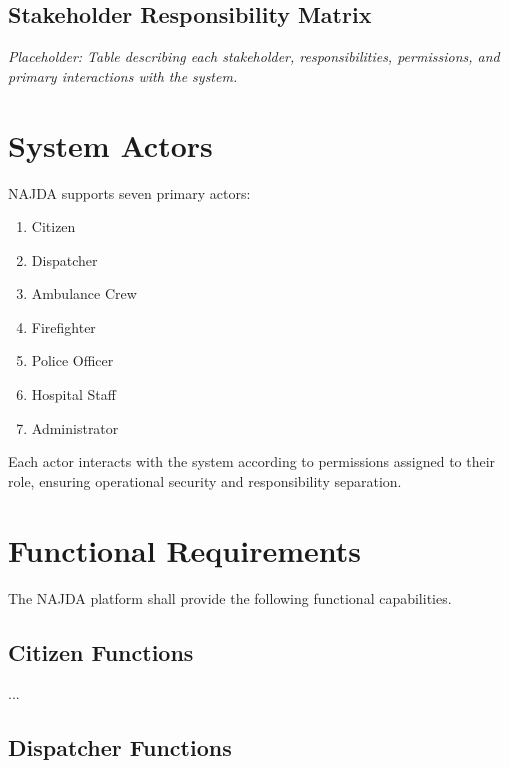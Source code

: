 \subsection{Stakeholder Responsibility Matrix}

\textit{Placeholder: Table describing each stakeholder, responsibilities, permissions, and primary interactions with the system.}


\section{System Actors}

NAJDA supports seven primary actors:

\begin{enumerate}
    \item Citizen
    \item Dispatcher
    \item Ambulance Crew
    \item Firefighter
    \item Police Officer
    \item Hospital Staff
    \item Administrator
\end{enumerate}

Each actor interacts with the system according to permissions assigned to their role, ensuring operational security and responsibility separation.


\section{Functional Requirements}

The NAJDA platform shall provide the following functional capabilities.


\subsection{Citizen Functions}

...

\subsection{Dispatcher Functions}

